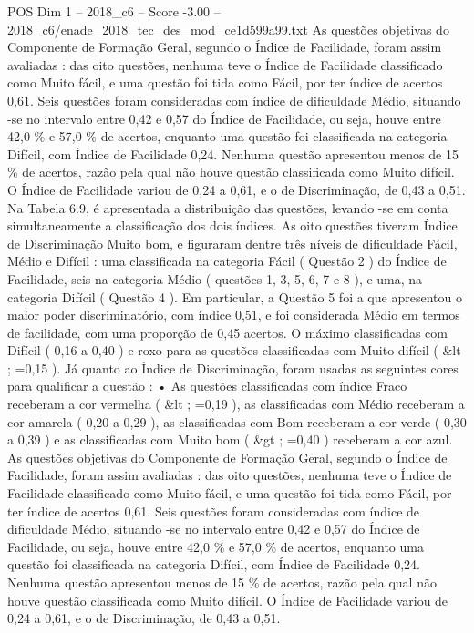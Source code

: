 \begin{textsample}{POS Dim 1 – 2018\_c6 – Score -3.00 – 2018\_c6/enade\_2018\_tec\_des\_mod\_ce1d599a99.txt}
As questões objetivas do Componente de Formação Geral, segundo o Índice de Facilidade, foram assim avaliadas : das oito questões, nenhuma teve o Índice de Facilidade classificado como Muito fácil, e uma questão foi tida como Fácil, por ter índice de acertos 0,61.
Seis questões foram consideradas com índice de dificuldade Médio, situando -se no intervalo entre 0,42 e 0,57 do Índice de Facilidade, ou seja, houve entre 42,0 \% e 57,0 \% de acertos, enquanto uma questão foi classificada na categoria Difícil, com Índice de Facilidade 0,24.
Nenhuma questão apresentou menos de 15 \% de acertos, razão pela qual não houve questão classificada como Muito difícil.
O Índice de Facilidade variou de 0,24 a 0,61, e o de Discriminação, de 0,43 a 0,51.
Na Tabela 6.9, é apresentada a distribuição das questões, levando -se em conta simultaneamente a classificação dos dois índices.
As oito questões tiveram Índice de Discriminação Muito bom, e figuraram dentre três níveis de dificuldade Fácil, Médio e Difícil : uma classificada na categoria Fácil ( Questão 2 ) do Índice de Facilidade, seis na categoria Médio ( questões 1, 3, 5, 6, 7 e 8 ), e uma, na categoria Difícil ( Questão 4 ).
Em particular, a Questão 5 foi a que apresentou o maior poder discriminatório, com índice 0,51, e foi considerada Médio em termos de facilidade, com uma proporção de 0,45 acertos.
O máximo classificadas com Difícil ( 0,16 a 0,40 ) e roxo para as questões classificadas com Muito difícil ( \&lt ; =0,15 ).
Já quanto ao Índice de Discriminação, foram usadas as seguintes cores para qualificar a questão : • As questões classificadas com índice Fraco receberam a cor vermelha ( \&lt ; =0,19 ), as classificadas com Médio receberam a cor amarela ( 0,20 a 0,29 ), as classificadas com Bom receberam a cor verde ( 0,30 a 0,39 ) e as classificadas com Muito bom ( \&gt ; =0,40 ) receberam a cor azul.
As questões objetivas do Componente de Formação Geral, segundo o Índice de Facilidade, foram assim avaliadas : das oito questões, nenhuma teve o Índice de Facilidade classificado como Muito fácil, e uma questão foi tida como Fácil, por ter índice de acertos 0,61.
Seis questões foram consideradas com índice de dificuldade Médio, situando -se no intervalo entre 0,42 e 0,57 do Índice de Facilidade, ou seja, houve entre 42,0 \% e 57,0 \% de acertos, enquanto uma questão foi classificada na categoria Difícil, com Índice de Facilidade 0,24.
Nenhuma questão apresentou menos de 15 \% de acertos, razão pela qual não houve questão classificada como Muito difícil.
O Índice de Facilidade variou de 0,24 a 0,61, e o de Discriminação, de 0,43 a 0,51.

\end{textsample}
